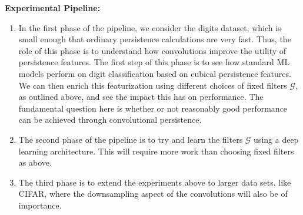 \documentclass[conference]{IEEEtran}
\theoremstyle{definition}
\numberwithin{figure}{section}
\begin{document}
  


{\bf Experimental Pipeline:}
\begin{enumerate}
	\item In the first phase of the pipeline, we consider the digits dataset, which is small enough that ordinary persistence calculations are very fast. Thus, the role of this phase is to understand how convolutions improve the utility of persistence features. The first step of this phase is to see how standard ML models perform on digit classification based on cubical persistence features. We can then enrich this featurization using different choices of fixed filters $\mathcal{G}$, as outlined above, and see the impact this has on performance. The fundamental question here is whether or not reasonably good performance can be achieved through convolutional persistence. 
	\item The second phase of the pipeline is to try and learn the filters $\mathcal{G}$ using a deep learning architecture. This will require more work than choosing fixed filters as above.
	\item The third phase is to extend the experiments above to larger data sets, like CIFAR, where the downsampling aspect of the convolutions will also be of importance.
\end{enumerate}



%
%


\end{document}
